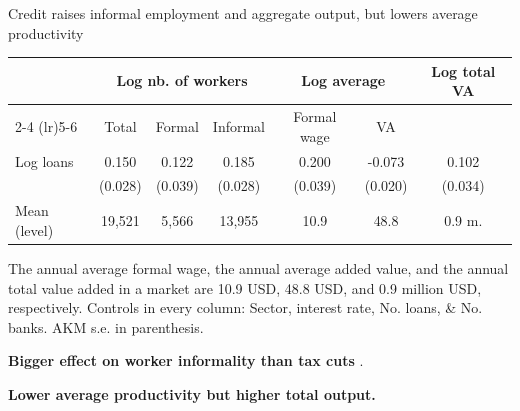 \documentclass[aspectratio=169]{beamer}
\begin{document}
\begin{frame}{Credit raises informal employment and aggregate output, but lowers average productivity}

\begin{center}
    \begin{tabular}{lcccccc}
        \toprule
         & \multicolumn{3}{c}{Log nb. of workers} & \multicolumn{2}{c}{Log average} & \multirow{2}{*}{Log total VA} \\
        \cmidrule(lr){2-4} \cmidrule(lr){5-6}
         & Total & Formal & Informal & Formal wage & VA &  \\
        \midrule
        Log loans 
        & 0.150 & 0.122 & 0.185 & 0.200  & -0.073  & 0.102 \\
        & (0.028) & (0.039) & (0.028) & (0.039) & (0.020) & (0.034) \\
        \midrule
        Mean (level) & 19,521 & 5,566 & 13,955 & 10.9 & 48.8 & 0.9 m. \\
        \bottomrule
    \end{tabular}
    \begin{tablenotes}[flushleft]
        \tiny
        \item The annual average formal wage, the annual average added value, and the annual total value added in a market are 10.9 USD, 48.8 USD, and 0.9 million USD, respectively. Controls in every column: Sector, interest rate, No. loans, \& No. banks. AKM s.e. in parenthesis.
    \end{tablenotes}
\end{center}
\pause

\vspace{3mm}

\textbf{Bigger effect on worker informality than tax cuts}  \textcolor{gray}{\cite{bobba2021labor,rocha2018lower,campos2020effects}}.
\pause

\vspace{3mm}

\textbf{Lower average productivity but higher total output.}


\end{frame}

\end{document}
